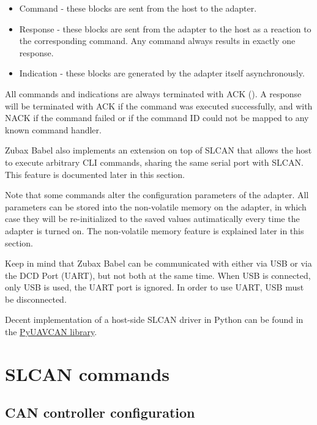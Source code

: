 \documentclass{zubaxdoc}
\begin{document}
\begin{itemize}
\item Command - these blocks are sent from the host to the adapter.
\item Response - these blocks are sent from the adapter to the host as a reaction to the corresponding command. Any command always results in exactly one response.
\item Indication - these blocks are generated by the adapter itself asynchronously.
\end{itemize}

All commands and indications are always terminated with ACK (). A response will be terminated with ACK if the command was executed successfully, and with NACK if the command failed or if the command ID could not be mapped to any known command handler.

Zubax Babel also implements an extension on top of SLCAN that allows the host to execute arbitrary CLI commands, sharing the same serial port with SLCAN. This feature is documented later in this section.

Note that some commands alter the configuration parameters of the adapter. All parameters can be stored into the non-volatile memory on the adapter, in which case they will be re-initialized to the saved values autimatically every time the adapter is turned on. The non-volatile memory feature is explained later in this section.

Keep in mind that Zubax Babel can be communicated with either via USB or via the DCD Port (UART), but not both at the same time. When USB is connected, only USB is used, the UART port is ignored. In order to use UART, USB must be disconnected.

Decent implementation of a host-side SLCAN driver in Python can be found in the \href{http://uavcan.org/Implementations/Pyuavcan/}{PyUAVCAN library}.
\clearpage

\section{SLCAN commands}

\subsection{CAN controller configuration}
\end{document}
